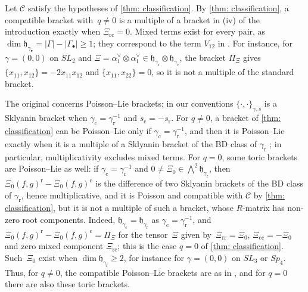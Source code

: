 \documentclass[a4paper]{amsart}
\numberwithin{equation}{section}
\theoremstyle{definition}
\theoremstyle{remark}
\newcommand{\mfh}{\mathfrak{h}}
\newcommand{\mcC}{\mathcal{C}}
\newcommand{\rr}{\mathrm{r}}
\newcommand{\cc}{\mathrm{c}}
\newcommand{\toric}{\Pi}
\begin{document}
\begin{remark}
  \label{rmk: v}
  Let $\mcC$ satisfy the hypotheses of \cref{thm: classification}.
  By \cref{thm: classification}, a compatible bracket with~$q\neq0$ is a multiple of a bracket in (iv) of the introduction exactly when $\Xi_\mathrm{rc}=0$.
  Mixed terms exist for every pair, as $\dim\mfh_{\gamma_\bullet}=|\Gamma|-|\Gamma_\bullet|\ge1$; they correspond to the term $V_{12}$ in \cite[Section~4]{GSV11}.
  For instance, for $\gamma=(0,0)$ on $SL_2$ and $\Xi=\alpha_1^\vee\otimes\alpha_1^\vee\in\mfh_{\gamma_{\rr}}\otimes\mfh_{\gamma_{\cc}}$, the bracket $\toric_\Xi$ gives $\{x_{11},x_{12}\}=-2x_{11}x_{12}$ and $\{x_{11},x_{22}\}=0$, so it is not a multiple of the standard bracket.

  The original \cite[Conjecture~3.2(v)]{GSV11} concerns Poisson--Lie brackets; in our conventions $\{\cdot,\cdot\}_{\gamma,s}$ is a Sklyanin bracket when $\gamma_{\cc}=\gamma_{\rr}^{-1}$ and $s_{\cc}=-s_{\rr}$.
  For $q\neq0$, a bracket of \cref{thm: classification} can be Poisson--Lie only if $\gamma_{\cc}=\gamma_{\rr}^{-1}$, and then it is Poisson--Lie exactly when it is a multiple of a Sklyanin bracket of the BD class of $\gamma_{\rr}$ \cite[Lemma~4.3(ii)]{GSV11}; in particular, multiplicativity excludes mixed terms.
  For $q=0$, some toric brackets are Poisson--Lie as well: if $\gamma_{\cc}=\gamma_{\rr}^{-1}$ and $0\neq\Xi_0\in\bigwedge^2\mfh_{\gamma_{\rr}}$, then $\Xi_0(f,g)^\rr-\Xi_0(f,g)^\cc$ is the difference of two Sklyanin brackets of the BD class of $\gamma_{\rr}$, hence multiplicative, and it is Poisson and compatible with $\mcC$ by \cref{thm: classification}, but it is not a multiple of such a bracket, whose $R$-matrix has non-zero root components.
  Indeed, $\mfh_{\gamma_{\cc}}=\mfh_{\gamma_{\rr}}$ as $\gamma_{\cc}=\gamma_{\rr}^{-1}$, and $\Xi_0(f,g)^\rr-\Xi_0(f,g)^\cc=\toric_\Xi$ for the tensor~$\Xi$ given by~$\Xi_\mathrm{rr}=\Xi_0$, $\Xi_\mathrm{cc}=-\Xi_0$ and zero mixed component $\Xi_\mathrm{rc}$; this is the case $q=0$ of \cref{thm: classification}.
  Such~$\Xi_0$ exist when $\dim\mfh_{\gamma_{\rr}}\ge2$, for instance for $\gamma=(0,0)$ on $SL_3$ or $Sp_4$.
  Thus, for $q\neq0$, the compatible Poisson--Lie brackets are as in \cite[Conjecture~3.2(v)]{GSV11}, and for $q=0$ there are also these toric brackets.
\end{remark}



\end{document}
